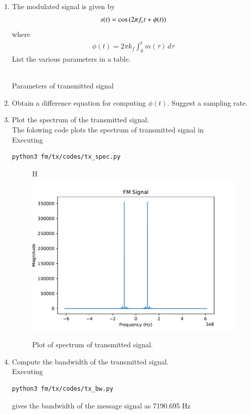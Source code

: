 \begin{enumerate}[label=\arabic*.,ref=\thesection.\theenumi]
\item The modulated signal is given by 
\begin{align}
	s(t) = \cos\left(2\pi f_c t + \phi(t)\right)
\end{align}
where
\begin{align}
	\phi(t) = 2\pi k_f \int_{0}^{t}m(\tau)\,d\tau
\end{align}
List the various parameters in a table.
\\
\solution
\\
\begin{table}
  \centering
  
  \caption{Parameters of transmitted signal}
  \label{tab:4.1}
\end{table}
\item Obtain a difference equation for computing $\phi(t)$.  Suggest a sampling rate.
\\
\solution
\item Plot the spectrum of the transmitted signal.
\\
\solution
The folowing code plots the spectrum of transmitted signal in 
\\
Executing
\begin{lstlisting}
python3 fm/tx/codes/tx_spec.py
\end{lstlisting}
\begin{figure}{H}
\centering	
\includegraphics[width=\columnwidth]{fm/tx/figs/tx_spec.pdf} 
\caption{Plot of spectrum of transmitted signal.}
\label{fig:Trans}
\end{figure}

\item Compute the bandwidth of the transmitted signal.
\\
\solution
Executing
\begin{lstlisting}
python3 fm/tx/codes/tx_bw.py
\end{lstlisting}
gives the bandwidth of the message signal as 7190.695 Hz

\end{enumerate}
